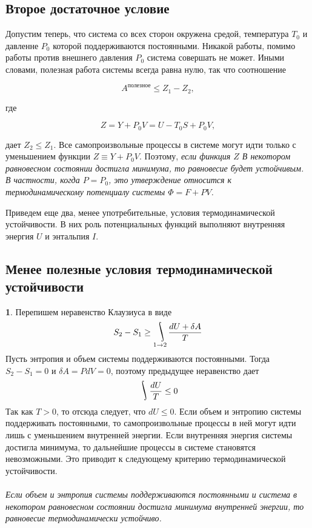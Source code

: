 \documentclass[a4paper,14pt]{article} %
\DeclareMathOperator*{\myint}{\ThisStyle{\rotatebox{25}{$\SavedStyle\!\int\!\!\!$}}}
\begin{document}
\subsection{Второе достаточное условие}

Допустим теперь, что система со всех сторон окружена средой, температура $T_{0}$ и давленне $P_{0}$ которой поддерживаются постоянными. Никакой работы, помимо работы против внешнего давления $P_{0}$ система совершать не может. Иными словами, полезная работа системы всегда равна нулю, так что соотношение 

\begin{equation*}
A^{\text {полезное}} \leqslant Z_{1}-Z_{2},
\end{equation*}

где 

\begin{equation*}
Z=Y+P_{0} V=U-T_{0} S+P_{0} V,
\end{equation*}

 дает $Z_{2} \leqslant Z_{1} .$ Все самопроизвольные процессы в системе могут идти только с уменьшением функции $Z \equiv Y+P_{0} V .$ Поэтому, \textit{если финкция $Z$ В некотором равновесном состоянии достигла минимума, то равновесие будет устойчивым. В частности, когда $P = P_0$,  это утверждение относится к термодинамическому потенциалу системы $\Phi = F+ P V$.}
 
Приведем еще два, менее употребительные, условия термодинамической устойчивости. В них роль потенциалыных функций выполняют внутренняя энергия $U$ и энтальпия $I$.

\subsection{Менее полезные условия термодинамической устойчивости}

\textbf{1}. Перепишем неравенство Клаузиуса в виде
\[S_2 - S_1 \geq \myint_{1\rightarrow 2}{\frac{dU + \delta A}{T}}\]
Пусть энтропия и объем системы поддерживаются постоянными. Тогда $S_2 - S_1 = 0$ и $\delta A = PdV = 0$, поэтому предыдущее неравенство дает 
\[\myint{\frac{dU}{T}} \leq 0\]
Так как $T > 0$, то отсюда следует, что $dU \leq 0$. Если объем и
энтропию системы поддерживать постоянными, то самопроизвольные процессы в ней могут идти лишь с уменьшением внутренней
энергии. Если внутренняя энергия системы достигла минимума, то
дальнейшие процессы в системе становятся невозможными. Это
приводит к следующему критерию термодинамической устойчивости.\\\\
\textit{Если объем и энтропия системы поддерживаются постоянными
и система в некотором равновесном состоянии достигла минимума
внутренней энергии, то равновесие термодинамически устойчиво.} 
\end{document}
